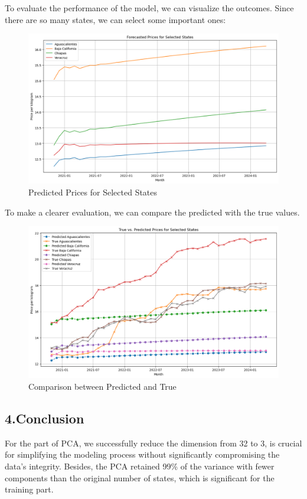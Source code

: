 \documentclass[12pt]{article}
\begin{document}
To evaluate the performance of the model, we can visualize the outcomes. Since there are so many states, we can select some important ones:\\
\begin{figure}[H]
    \centering
    \includegraphics[width=1\linewidth]{Visualization for some states.png}
    \caption*{Predicted Prices for Selected States}
\end{figure}
To make a clearer evaluation, we can compare the predicted with the true values. 
\begin{figure}[H]
    \centering
    \includegraphics[width=1\linewidth]{Comparison.png}
    \caption*{Comparison between Predicted and True}
\end{figure}

\subsection*{4.Conclusion}
For the part of PCA, we successfully reduce the dimension from 32 to 3, is crucial for simplifying the modeling process without significantly compromising the data's integrity. Besides, the PCA retained 99\% of the variance with fewer components than the original number of states, which is significant for the training part.\\
\end{document}
